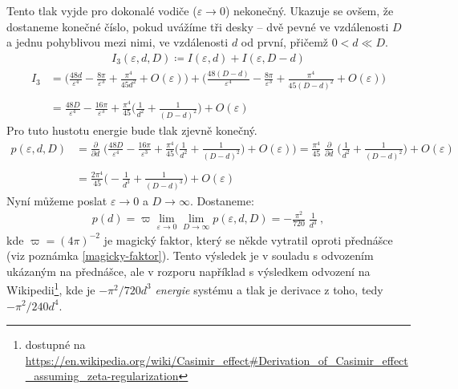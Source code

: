\documentclass[10pt,a4paper]{article}
\newcommand{\pd}[2]{\frac{\partial  #1}{\partial  #2} \;}
\begin{document}
Tento tlak vyjde pro dokonalé vodiče ($\varepsilon \to 0$) nekonečný. Ukazuje se ovšem, že dostaneme konečné číslo, pokud uvážíme tři desky – dvě pevné ve vzdálenosti $D$ a jednu pohyblivou mezi nimi, ve vzdálenosti $d$ od první, přičemž $0 < d \ll D$.
\begin{align*}
    I_3(\varepsilon, d, D)
    \coloneqq I(\varepsilon, d) + I(\varepsilon, D - d)
\end{align*}
\begin{align*}
    I_3
    &=
    \big(
        \frac{48 d}{\varepsilon^4}
        - \frac{8 \pi}{\varepsilon^3}
        + \frac{\pi^4}{45 d^2}
        + O(\varepsilon)
    \big)
    +
    \big(
        \frac{48 (D - d)}{\varepsilon^4}
        - \frac{8 \pi}{\varepsilon^3}
        + \frac{\pi^4}{45 (D-d)^2}
        + O(\varepsilon)
    \big)
    \\\\
    &=
    \frac{48 D}{\varepsilon^4}
    - \frac{16 \pi}{\varepsilon^3}
    + \frac{\pi^4}{45}
    \big( \frac{1}{d^2} + \frac{1}{(D-d)^2} \big)
    + O(\varepsilon)
\end{align*}
Pro tuto hustotu energie bude tlak zjevně konečný.
\begin{align*}
    p(\varepsilon, d, D)
    &=
    \pd{}{d}
    \bigg(
        \frac{48 D}{\varepsilon^4}
        - \frac{16 \pi}{\varepsilon^3}
        + \frac{\pi^4}{45}
        \big( \frac{1}{d^2} + \frac{1}{(D-d)^2} \big)
        + O(\varepsilon)
    \bigg)
    = \frac{\pi^4}{45} \; \pd{}{d} \big( \frac{1}{d^2} + \frac{1}{(D-d)^2} \big) + O(\varepsilon)
    \\\\
    &=
    \frac{2\pi^4}{45} \big(
        -\frac{1}{d^3} + \frac{1}{(D-d)^3}
    \big) + O(\varepsilon)
\end{align*}
Nyní můžeme poslat $\varepsilon \to 0$ a $D \to \infty$. Dostaneme:
\begin{align*}
    p(d) =
    \varpi
    \lim_{\varepsilon\to 0} \lim_{D\to\infty}
    p(\varepsilon, d, D)
    =
    -\frac{\pi^2}{720} \;
    \frac{1}{d^3}
    \: ,
\end{align*}
kde $\varpi = (4\pi)^{-2}$ je magický faktor, který se někde vytratil oproti přednášce (viz poznámka \ref{magicky-faktor}). Tento výsledek je v souladu s odvozením ukázaným na přednášce, ale v rozporu například s výsledkem odvození na Wikipedii\footnote{dostupné na \url{https://en.wikipedia.org/wiki/Casimir_effect\#Derivation_of_Casimir_effect_assuming_zeta-regularization}}, kde je $-\pi^2 / 720 d^3$ \textit{energie} systému a tlak je derivace z toho, tedy $-\pi^2 / 240 d^4$.
\end{document}

